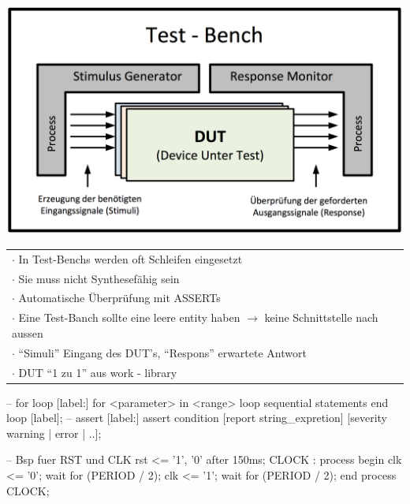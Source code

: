 \begin{minipage}{0.4\textwidth}
	\includegraphics[width=\textwidth]{./bilder/TestBench}
\end{minipage}
\begin{minipage}{0.6\textwidth}
	\begin{tabular}{l}
		$\cdot$ In Test-Benchs werden oft Schleifen eingesetzt \\
		$\cdot$ Sie muss nicht Synthesefähig sein  \\
		$\cdot$ Automatische Überprüfung mit ASSERTs \\
		$\cdot$ Eine Test-Banch sollte eine leere entity haben {\tiny $\rightarrow$ keine Schnittstelle nach aussen}  \\
		$\cdot$ "`Simuli"' Eingang des DUT's, "`Respons"' erwartete Antwort\\
		$\cdot$ DUT "`1 zu 1"' aus work - library\\
	\end{tabular}
	
	\begin{minipage}{0.02\textwidth}
		\text{ } %
	\end{minipage}
	\begin{minipage}{0.52\textwidth}
		\begin{VHDL}
-- for loop
[label:] for <parameter> in <range> loop
	{sequential statements}
end loop [label];
-- assert
[label:] assert condition [report string_expretion]
	[severity warning | error | ..];\end{VHDL}
	\end{minipage}
	\begin{minipage}{0.02\textwidth}
		\text{ } %
	\end{minipage}
	\begin{minipage}{0.38\textwidth}
		\begin{VHDL}
-- Bsp fuer RST und CLK
rst <= '1', '0' after 150ms;
CLOCK : process
begin 
	clk <= '0';
	wait for (PERIOD / 2);
	clk <= '1';
	wait for (PERIOD / 2);
end process CLOCK;\end{VHDL}
	\end{minipage}
\end{minipage}


